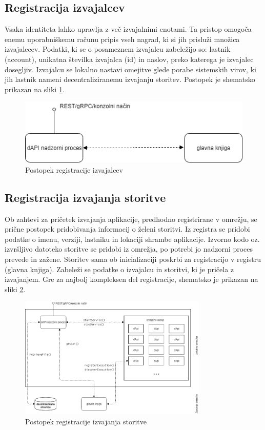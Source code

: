 \documentclass[a4paper, 12pt]{book}
\begin{document}
\subsection{Registracija izvajalcev}
\label{registerWorker}
Vsaka identiteta lahko upravlja z več izvajalnimi enotami.
Ta pristop omogoča enemu uporabniškemu računu pripis vseh nagrad, ki si jih prisluži množica izvajalecev.
Podatki, ki se o posameznem izvajalcu zabeležijo so: lastnik (account), unikatna številka izvajalca (id) in naslov, preko katerega je izvajalec dosegljiv.
Izvajalcu se lokalno nastavi omejitve glede porabe sistemskih virov, ki jih lastnik nameni decentraliziranemu izvajanju storitev.
Postopek je shematsko prikazan na sliki \ref{register_worker}.

\begin{figure}[h]
	\centering
	\includegraphics[width=1.0\textwidth]{slike/register_worker.png}
	\caption{Postopek registracije izvajalcev}
	\label{register_worker}
\end{figure}

\subsection{Registracija izvajanja storitve}
\label{registerExecution}
Ob zahtevi za pričetek izvajanja aplikacije, predhodno registrirane v omrežju, se prične postopek pridobivanja informacij o želeni storitvi.
Iz registra se pridobi podatke o imenu, verziji, lastniku in lokaciji shrambe aplikacije.
Izvorno kodo oz. izvršljivo datoteko storitve se pridobi iz omrežja, po potrebi jo nadzorni proces prevede in zažene.
Storitev sama ob inicializaciji poskrbi za registracijo v registru (glavna knjiga).
Zabeleži se podatke o izvajalcu in storitvi, ki je pričela z izvajanjem.
Gre za najbolj kompleksen del registracije, shematsko je prikazan na sliki \ref{register_service}.

\begin{figure}[h]
	\centering
	\includegraphics[width=0.8\textwidth]{slike/register_service.png}
	\caption{Postopek registracije izvajanja storitve}
	\label{register_service}
\end{figure}
\end{document}
